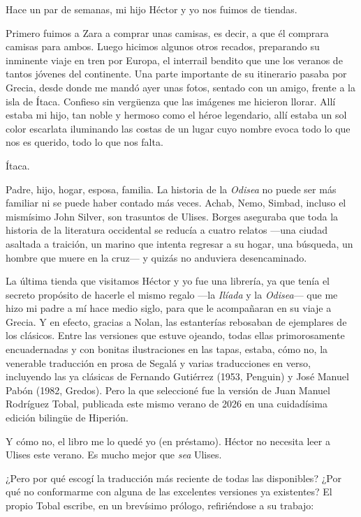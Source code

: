 
Hace un par de semanas, mi hijo Héctor y yo nos fuimos de tiendas.

Primero fuimos a Zara a comprar unas camisas, es decir, a que él comprara camisas para ambos. Luego hicimos algunos otros recados, preparando su inminente viaje en tren por Europa, el interrail bendito que une los veranos de tantos jóvenes del continente. Una parte importante de su itinerario pasaba por Grecia, desde donde me mandó ayer unas fotos, sentado con un amigo, frente a la isla de Ítaca. Confieso sin vergüenza que las imágenes me hicieron llorar. Allí estaba mi hijo, tan noble y hermoso como el héroe legendario, allí estaba un sol color escarlata iluminando las costas de un lugar cuyo nombre evoca todo lo que nos es querido, todo lo que nos falta.

Ítaca.

Padre, hijo, hogar, esposa, familia. La historia de la \emph{Odisea} no puede ser más familiar ni se puede haber contado más veces. Achab, Nemo, Simbad, incluso el mismísimo John Silver, son trasuntos de Ulises. Borges aseguraba que toda la historia de la literatura occidental se reducía a cuatro relatos ---una ciudad asaltada a traición, un marino que intenta regresar a su hogar, una búsqueda, un hombre que muere en la cruz--- y quizás no anduviera desencaminado.

La última tienda que visitamos Héctor y yo fue una librería, ya que tenía el secreto propósito de hacerle el mismo regalo ---la \emph{Ilíada} y la \emph{Odisea}--- que me hizo mi padre a mí hace medio siglo, para que le acompañaran en su viaje a Grecia. Y en efecto, gracias a Nolan, las estanterías rebosaban de ejemplares de los clásicos. Entre las versiones que estuve ojeando, todas ellas primorosamente encuadernadas y con bonitas ilustraciones en las tapas, estaba, cómo no, la venerable traducción en prosa de Segalá y varias traducciones en verso, incluyendo las ya clásicas de Fernando Gutiérrez (1953, Penguin) y José Manuel Pabón (1982, Gredos). Pero la que seleccioné fue la versión de Juan Manuel Rodríguez Tobal, publicada este mismo verano de 2026 en una cuidadísima edición bilingüe de Hiperión. 

Y cómo no, el libro me lo quedé yo (en préstamo). Héctor no necesita leer a Ulises este verano. Es mucho mejor que \emph{sea} Ulises.

¿Pero por qué escogí la traducción más reciente de todas las disponibles? ¿Por qué no conformarme con alguna de las excelentes versiones ya existentes? 
El propio Tobal escribe, en un brevísimo prólogo, refiriéndose a su trabajo:

